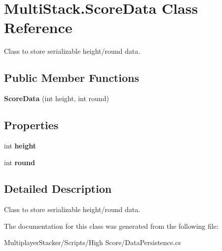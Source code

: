 \hypertarget{class_multi_stack_1_1_score_data}{}\section{Multi\+Stack.\+Score\+Data Class Reference}
\label{class_multi_stack_1_1_score_data}


Class to store serializable height/round data.  


\subsection*{Public Member Functions}
\begin{DoxyCompactItemize}
\item 
\hypertarget{class_multi_stack_1_1_score_data_a31a1224f670eee65b8d5bb4c17dd3f7f}{}{\bfseries Score\+Data} (int height, int round)\label{class_multi_stack_1_1_score_data_a31a1224f670eee65b8d5bb4c17dd3f7f}

\end{DoxyCompactItemize}
\subsection*{Properties}
\begin{DoxyCompactItemize}
\item 
\hypertarget{class_multi_stack_1_1_score_data_a1bcafbbbac6cd706b9fcd43bd9f24ff5}{}int {\bfseries height}\label{class_multi_stack_1_1_score_data_a1bcafbbbac6cd706b9fcd43bd9f24ff5}

\item 
\hypertarget{class_multi_stack_1_1_score_data_a2cb31be34c6c2aaa90027384b7be6390}{}int {\bfseries round}\label{class_multi_stack_1_1_score_data_a2cb31be34c6c2aaa90027384b7be6390}

\end{DoxyCompactItemize}


\subsection{Detailed Description}
Class to store serializable height/round data. 



The documentation for this class was generated from the following file\+:\begin{DoxyCompactItemize}
\item 
Multiplayer\+Stacker/\+Scripts/\+High Score/Data\+Persistence.\+cs\end{DoxyCompactItemize}
